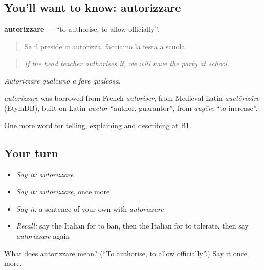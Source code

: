 \subsection*{You'll want to know: autorizzare}
\textbf{autorizzare} — \textquotedblleft{}to authorise, to allow officially\textquotedblright{}.

\begin{quote}
Se il preside ci autorizza, facciamo la festa a scuola.
\end{quote}

\begin{quote}
\emph{If the head teacher authorises it, we will have the party at school.}
\end{quote}

\emph{Autorizzare qualcuno a fare qualcosa}.

\begin{cousinweb}
\emph{autorizzare} was borrowed from French \emph{autoriser}, from Medieval Latin \emph{auctōrizāre} (EtymDB), built on Latin \emph{auctor} \textquotedblleft{}author, guarantor\textquotedblright{}, from \emph{augēre} \textquotedblleft{}to increase\textquotedblright{}.
\end{cousinweb}

\begin{grammarlens}[title={What you've built}]
One more word for telling, explaining and describing at B1.
\end{grammarlens}

\subsection*{Your turn}
\begin{itemize}
\raggedright
  \item \emph{Say it:} \emph{autorizzare}
  \item \emph{Say it:} \emph{autorizzare}, once more
  \item \emph{Say it:} a sentence of your own with \emph{autorizzare}
  \item \emph{Recall:} say the Italian for to ban, then the Italian for to tolerate, then say \emph{autorizzare} again
\end{itemize}

\begin{tcolorbox}[breakable,colback=teal!4,colframe=teal!35!black,title={Before you move on}]
What does autorizzare mean? (\textquotedblleft{}To authorise, to allow officially\textquotedblright{}.) Say it once more.
\end{tcolorbox}
